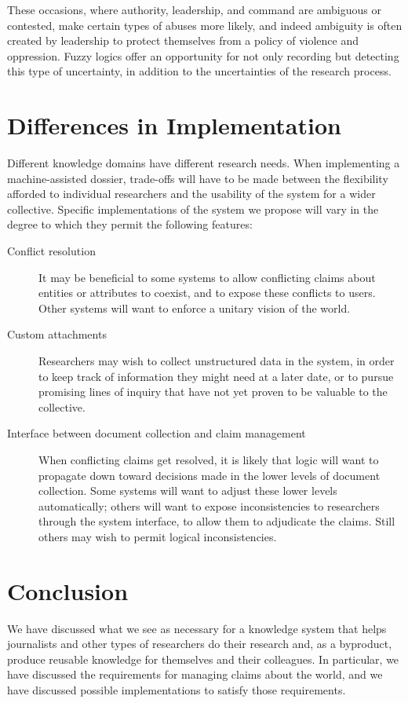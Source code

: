 \documentclass[format=siggraph, review=true]{acmart}
\begin{document}
These occasions, where authority, leadership, and command are
ambiguous or contested, make certain types of abuses more likely, and
indeed ambiguity is often created by leadership to protect themselves
from a policy of violence and oppression. Fuzzy logics offer an
opportunity for not only recording but detecting this type of uncertainty, in addition to
the uncertainties of the research process.

\section{Differences in Implementation}

Different knowledge domains have different research needs. When
implementing a machine-assisted dossier, trade-offs will have to be made
between the flexibility afforded to individual researchers and the
usability of the system for a wider collective. Specific implementations
of the system we propose will vary in the degree to which they permit
the following features:

\begin{description}
  \item [Conflict resolution] It may be beneficial to some systems to
    allow conflicting claims about entities or attributes to coexist,
    and to expose these conflicts to users. Other systems will want
    to enforce a unitary vision of the world.

  \item [Custom attachments] Researchers may wish to collect unstructured
    data in the system, in order to keep track of information they might
    need at a later date, or to pursue promising lines of inquiry that
    have not yet proven to be valuable to the collective.

  \item [Interface between document collection and claim management] When
    conflicting claims get resolved, it is likely that logic will
    want to propagate down toward decisions made in the lower levels
    of document collection. Some systems will want to adjust these lower
    levels automatically; others will want to expose inconsistencies to
    researchers through the system interface, to allow them to adjudicate
    the claims. Still others may wish to permit logical inconsistencies.
\end{description}

\section{Conclusion}
We have discussed what we see as necessary for a knowledge system that
helps journalists and other types of researchers do their research
and, as a byproduct, produce reusable knowledge for themselves and
their colleagues. In particular, we have discussed the requirements
for managing claims about the world, and we have discussed possible
implementations to satisfy those requirements.
\end{document}

